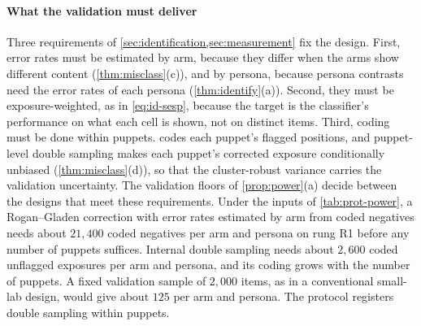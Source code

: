 \paragraph{What the validation must deliver}
Three requirements of \cref{sec:identification,sec:measurement} fix the design. First, error rates must be estimated by arm, because they differ when the arms show different content (\cref{thm:misclass}(c)), and by persona, because persona contrasts need the error rates of each persona (\cref{thm:identify}(a)). Second, they must be exposure-weighted, as in \eqref{eq:id-sesp}, because the target is the classifier's performance on what each cell is shown, not on distinct items. Third, coding must be done within puppets.  codes each puppet's flagged positions, and puppet-level double sampling makes each puppet's corrected exposure conditionally unbiased (\cref{thm:misclass}(d)), so that the cluster-robust variance carries the validation uncertainty. The validation floors of \cref{prop:power}(a) decide between the designs that meet these requirements. Under the inputs of \cref{tab:prot-power}, a Rogan--Gladen correction with error rates estimated by arm from coded negatives needs about $21{,}400$ coded negatives per arm and persona on rung R1 before any number of puppets suffices. Internal double sampling needs about $2{,}600$ coded unflagged exposures per arm and persona, and its coding grows with the number of puppets. A fixed validation sample of $2{,}000$ items, as in a conventional small-lab design, would give about $125$ per arm and persona. The protocol registers double sampling within puppets.

